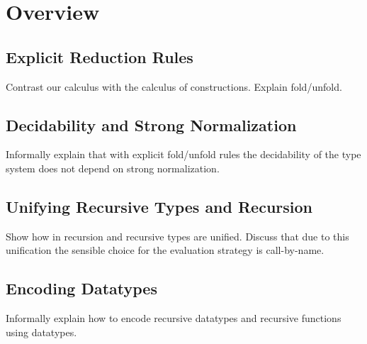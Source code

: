 \section{Overview}

\subsection{Explicit Reduction Rules}

Contrast our calculus with the calculus of constructions. Explain fold/unfold. 

\subsection{Decidability and Strong Normalization}

Informally explain that with explicit fold/unfold rules the decidability of the 
type system does not depend on strong normalization.

\subsection{Unifying Recursive Types and Recursion}

Show how in \name recursion and recursive types are unified. 
Discuss that due to this unification the sensible choice for the 
evaluation strategy is call-by-name. 

\subsection{Encoding Datatypes}

Informally explain how to encode recursive datatypes and recursive functions 
using datatypes.